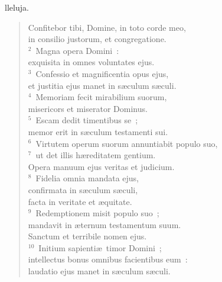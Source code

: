 \bchapter[Psalm]
lleluja. \begin{verse}Confitebor tibi, Domine, in toto corde meo,\\ in consilio justorum, et congregatione.\\
${}^{2}$~Magna opera Domini~:\\ exquisita in omnes voluntates ejus.\\
${}^{3}$~Confessio et magnificentia opus ejus,\\ et justitia ejus manet in s\ae culum s\ae culi.\\
${}^{4}$~Memoriam fecit mirabilium suorum,\\ misericors et miserator Dominus.\\
${}^{5}$~Escam dedit timentibus se~;\\ memor erit in s\ae culum testamenti sui.\\
${}^{6}$~Virtutem operum suorum annuntiabit populo suo,\\
${}^{7}$~ut det illis h\ae reditatem gentium.\\ Opera manuum ejus veritas et judicium.\\
${}^{8}$~Fidelia omnia mandata ejus,\\ confirmata in s\ae culum s\ae culi,\\ facta in veritate et \ae quitate.\\
${}^{9}$~Redemptionem misit populo suo~;\\ mandavit in \ae ternum testamentum suum.\\ Sanctum et terribile nomen ejus.\\
${}^{10}$~Initium sapienti\ae\ timor Domini~;\\ intellectus bonus omnibus facientibus eum~:\\ laudatio ejus manet in s\ae culum s\ae culi.\end{verse}



